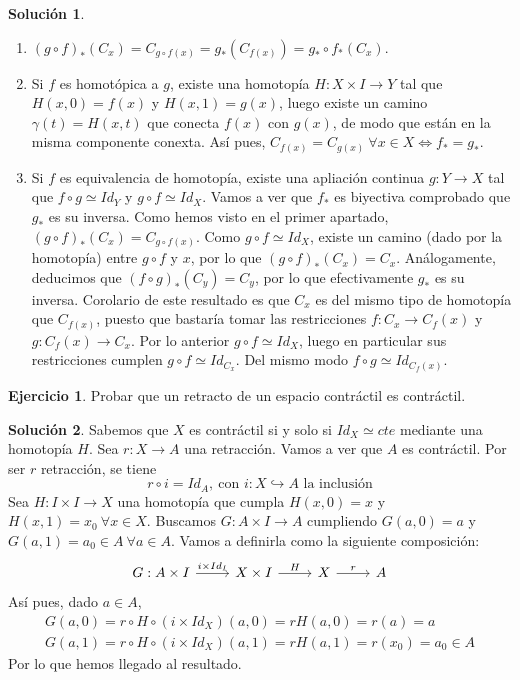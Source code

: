 \documentclass{article}
\theoremstyle{plain}
\theoremstyle{definition}
\newtheorem{exercise}{Ejercicio}
\newtheorem*{sol*}{Solución}
\begin{document}
\begin{sol*}
\begin{enumerate}
\item $(g\circ f)_*(C_x)=C_{g\circ f(x)}= g_*(C_{f(x)})=g_*\circ f_*(C_x)$.
\item Si $f$ es homotópica a $g$, existe una homotopía $H:X\times I\to Y$ tal que $H(x,0)=f(x)$ y $H(x,1)=g(x)$, luego existe un camino $\gamma(t)=H(x,t)$ que conecta $f(x)$ con $g(x)$, de modo que están en la misma componente conexta. Así pues, $C_{f(x)}=C_{g(x)}\ \forall x\in X\Leftrightarrow f_*=g_*$.
\item Si $f$ es equivalencia de homotopía, existe una apliación continua $g:Y\to X$ tal que $f\circ g\simeq Id_Y$ y $g\circ f\simeq Id_X$. Vamos a ver que $f_*$ es biyectiva comprobado que $g_*$ es su inversa. Como hemos visto en el primer apartado, $(g\circ f)_*(C_x)=C_{g\circ f(x)}$. Como $g\circ f\simeq Id_X$, existe un camino (dado por la homotopía) entre $g\circ f$ y $x$, por lo que  $(g\circ f)_*(C_x)=C_x$. Análogamente, deducimos que $(f\circ g)_*(C_y)=C_y$, por lo que efectivamente $g_*$ es su inversa. Corolario de este resultado es que $C_x$ es del mismo tipo de homotopía que $C_{f(x)}$, puesto que bastaría tomar las restricciones $f:C_x\to C_f(x)$ y $g:C_f(x)\to C_x$. Por lo anterior $g\circ f\simeq Id_X$, luego en particular sus restricciones cumplen $g\circ f\simeq Id_{C_x}$. Del mismo modo $f\circ g\simeq Id_{C_f(x)}$. 
\end{enumerate}
\end{sol*}
\newpage
\begin{exercise}
Probar que un retracto de un espacio contráctil es contráctil.
\end{exercise}
\begin{sol*}
Sabemos que $X$ es contráctil si y solo si $Id_X\simeq cte$ mediante una homotopía $H$. Sea $r:X\to A$ una retracción. Vamos a ver que $A$ es contráctil. Por ser $r$ retracción, se tiene
\[
r\circ i =Id_A,\ \text{con }i: X\hookrightarrow A\text{ la inclusión}
\]
Sea $H:I\times I\to X$ una homotopía que cumpla $H(x,0)=x$ y $H(x,1)=x_0\ \forall x\in X$. Buscamos $G:A\times I\to A$ cumpliendo  $G(a,0)=a$ y $G(a,1)=a_0\in A\ \forall a\in A$. Vamos a definirla como la siguiente composición:
\[
\begin{tikzcd}
G: A\times I \arrow[r,"i\times Id_I"]& X\times I \arrow[r, "H"] &  X \arrow[r,"r"] & A 
\end{tikzcd}
\]
Así pues, dado $a\in A$,
\begin{gather*}
G(a,0)=r\circ H\circ (i\times Id_X)(a,0)=rH(a,0)=r(a)=a\\
G(a,1)=r\circ H\circ (i\times Id_X)(a,1)=rH(a,1)=r(x_0)=a_0\in A
\end{gather*}
Por lo que hemos llegado al resultado. 
\end{sol*}
\newpage
\end{document}

